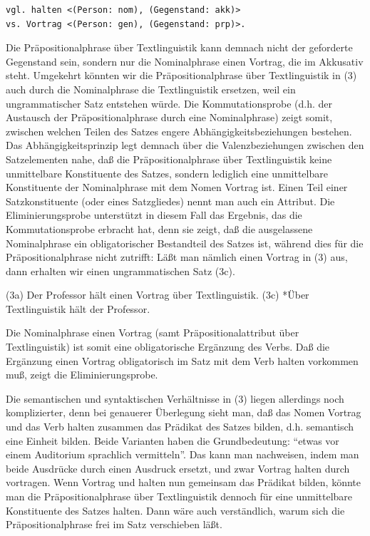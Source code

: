 \documentclass[
]{article}
\begin{document}
\begin{verbatim}
vgl. halten <(Person: nom), (Gegenstand: akk)> 
vs. Vortrag <(Person: gen), (Gegenstand: prp)>. 
\end{verbatim}

Die Präpositionalphrase über Textlinguistik kann demnach nicht der geforderte Gegenstand sein, sondern nur die Nominalphrase einen Vortrag, die im Akkusativ steht. Umgekehrt könnten wir die Präpositionalphrase über Textlinguistik in (3) auch durch die Nominalphrase die Textlinguistik ersetzen, weil ein ungrammatischer Satz entstehen würde. Die Kommutationsprobe (d.h. der Austausch der Präpositionalphrase durch eine Nominalphrase) zeigt somit, zwischen welchen Teilen des Satzes engere Abhängigkeitsbeziehungen bestehen. Das Abhängigkeitsprinzip legt demnach über die Valenzbeziehungen zwischen den Satzelementen nahe, daß die Präpositionalphrase über Textlinguistik keine unmittelbare Konstituente des Satzes, sondern lediglich eine unmittelbare Konstituente der Nominalphrase mit dem Nomen Vortrag ist. Einen Teil einer Satzkonstituente (oder eines Satzgliedes) nennt man auch ein Attribut. Die Eliminierungsprobe unterstützt in diesem Fall das Ergebnis, das die Kommutationsprobe erbracht hat, denn sie zeigt, daß die ausgelassene Nominalphrase ein obligatorischer Bestandteil des Satzes ist, während dies für die Präpositionalphrase nicht zutrifft: Läßt man nämlich einen Vortrag in (3) aus, dann erhalten wir einen ungrammatischen Satz (3c).

(3a) Der Professor hält einen Vortrag über Textlinguistik.
(3c) *Über Textlinguistik hält der Professor.

Die Nominalphrase einen Vortrag (samt Präpositionalattribut über Textlinguistik) ist somit eine obligatorische Ergänzung des Verbs. Daß die Ergänzung einen Vortrag obligatorisch im Satz mit dem Verb halten vorkommen muß, zeigt die Eliminierungsprobe.

Die semantischen und syntaktischen Verhältnisse in (3) liegen allerdings noch komplizierter, denn bei genauerer Überlegung sieht man, daß das Nomen Vortrag und das Verb halten zusammen das Prädikat des Satzes bilden, d.h. semantisch eine Einheit bilden. Beide Varianten haben die Grundbedeutung: ``etwas vor einem Auditorium sprachlich vermitteln''. Das kann man nachweisen, indem man beide Ausdrücke durch einen Ausdruck ersetzt, und zwar Vortrag halten durch vortragen. Wenn Vortrag und halten nun gemeinsam das Prädikat bilden, könnte man die Präpositionalphrase über Textlinguistik dennoch für eine unmittelbare Konstituente des Satzes halten. Dann wäre auch verständlich, warum sich die Präpositionalphrase frei im Satz verschieben läßt.
\end{document}
